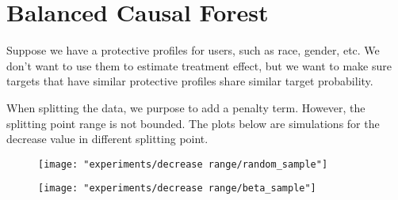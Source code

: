 \documentclass[12pt,letterpaper]{article}
\begin{document}
\section{Balanced Causal Forest}
Suppose we have a protective profiles for users, such as race, gender, etc. We don't want to use them to estimate treatment effect, but we want to make sure targets that have similar protective profiles share similar target probability. 


When splitting the data, we purpose to add a penalty term. However,  the splitting point range is not bounded. The plots below are simulations for the decrease value in different splitting point.  


\begin{figure}[H]
	\centering
	\label{fig:betasample}
	\texttt{[image: "experiments/decrease range/random\_sample"]}
\end{figure}


\begin{figure}[H]
	\centering
	\label{fig:betasample}
	\texttt{[image: "experiments/decrease range/beta\_sample"]}
\end{figure}
\end{document}
